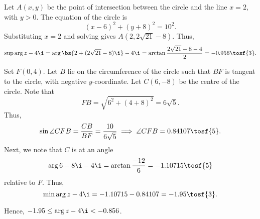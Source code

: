 \begin{solution}
\begin{ppart}
\begin{center}
        \end{center}
    \end{ppart}
    \begin{ppart}
        Let $A(x, y)$ be the point of intersection between the circle and the line $x = 2$, with $y > 0$. The equation of the circle is \[(x-6)^2 + (y+8)^2 = 10^2.\] Substituting $x = 2$ and solving gives $A(2, 2\sqrt{21} - 8)$. Thus, \[\sup \arg{z - 4\i} = \arg{\bs{2 + (2\sqrt{21} - 8)\i} - 4\i} = \arctan \frac{2\sqrt{21} -8 -4}{2} = -0.956 \tosf{3}.\]

        Set $F(0, 4)$. Let $B$ lie on the circumference of the circle such that $BF$ is tangent to the circle, with negative $y$-coordinate. Let $C(6, -8)$ be the centre of the circle. Note that \[FB = \sqrt{6^2 + (4+8)^2} = 6\sqrt{5}.\] Thus, \[\sin \angle CFB = \frac{CB}{BF} = \frac{10}{6\sqrt{5}} \implies \angle CFB = 0.84107 \tosf{5}.\] Next, we note that $C$ is at an angle \[\arg{6-8\i - 4\i} = \arctan \frac{-12}{6} = -1.10715 \tosf{5}\] relative to $F$. Thus, \[\min \arg{z-4\i} = -1.10715 - 0.84107 = -1.95 \tosf{3}.\]

        Hence, $-1.95 \leq \arg{z-4\i} < -0.856$.
    \end{ppart}
\end{solution}

